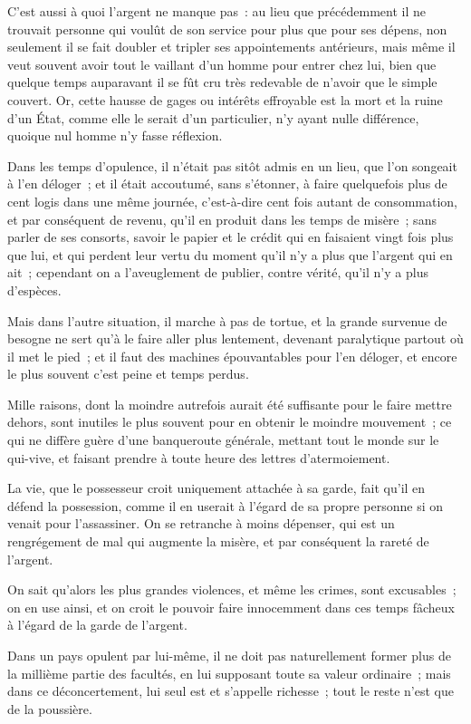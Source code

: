 \documentclass[french,twoside]{book} %
\begin{document}
C’est aussi à quoi l’argent ne manque pas : au lieu que précédemment il ne trouvait personne qui voulût de son service pour plus que pour ses dépens, non seulement il se fait doubler et tripler ses appointements antérieurs, mais même il veut souvent avoir tout le vaillant d’un homme pour entrer chez lui, bien que quelque temps auparavant il se fût cru très redevable de n’avoir que le simple couvert. Or, cette hausse de gages ou intérêts effroyable est la mort et la ruine d’un État, comme elle le serait d’un particulier, n’y ayant nulle différence, quoique nul homme n’y fasse réflexion.\par
Dans les temps d’opulence, il n’était pas sitôt admis en un lieu, que l’on songeait à l’en déloger ; et il était accoutumé, sans s’étonner, à faire quelquefois plus de cent logis dans une même journée, c’est-à-dire cent fois autant de consommation, et par conséquent de revenu, qu’il en produit dans les temps de misère ; sans parler de ses consorts, savoir le papier et le crédit qui en faisaient vingt fois plus que lui, et qui perdent leur vertu du moment qu’il n’y a plus que l’argent qui en ait ; cependant on a l’aveuglement de publier, contre vérité, qu’il n’y a plus d’espèces.\par
Mais dans l’autre situation, il marche à pas de tortue, et la grande survenue de besogne ne sert qu’à le faire aller plus lentement, devenant paralytique partout où il met le pied ; et il faut des machines épouvantables pour l’en déloger, et encore le plus souvent c’est peine et temps perdus.\par
Mille raisons, dont la moindre autrefois aurait été suffisante pour le faire mettre dehors, sont inutiles le plus souvent pour en obtenir le moindre mouvement ; ce qui ne diffère guère d’une banqueroute générale, mettant tout le monde sur le qui-vive, et faisant prendre à toute heure des lettres d’atermoiement.\par
La vie, que le possesseur croit uniquement attachée à sa garde, fait qu’il en défend la possession, comme il en userait à l’égard de sa propre personne si on venait pour l’assassiner. On se retranche à moins dépenser, qui est un rengrégement de mal qui augmente la misère, et par conséquent la rareté de l’argent.\par
On sait qu’alors les plus grandes violences, et même les crimes, sont excusables ; on en use ainsi, et on croit le pouvoir faire innocemment dans ces temps fâcheux à l’égard de la garde de l’argent.\par
Dans un pays opulent par lui-même, il ne doit pas naturellement former plus de la millième partie des facultés, en lui supposant toute sa valeur ordinaire ; mais dans ce déconcertement, lui seul est et s’appelle richesse ; tout le reste n’est que de la poussière.\par
\end{document}
